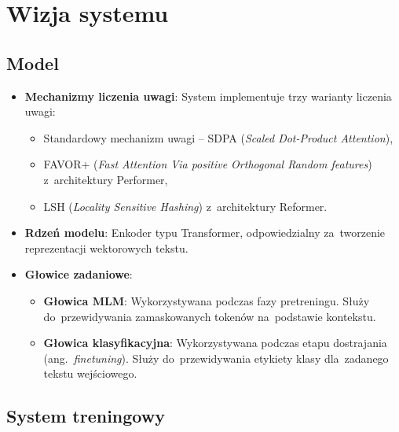 \documentclass[a4paper,11pt,twoside]{report}
\theoremstyle{definition}
\begin{document}
\section{Wizja systemu}


\subsection{Model}

\begin{itemize}
    \item \textbf{Mechanizmy liczenia uwagi}: System implementuje trzy warianty liczenia uwagi:
    \begin{itemize}
        \item Standardowy mechanizm uwagi -- SDPA (\emph{Scaled Dot-Product Attention}),
        \item FAVOR+ (\emph{Fast Attention Via positive Orthogonal Random features}) z~architektury Performer,
        \item LSH (\emph{Locality Sensitive Hashing}) z~architektury Reformer.
    \end{itemize}

    \item \textbf{Rdzeń modelu}: Enkoder typu Transformer, odpowiedzialny za~tworzenie reprezentacji wektorowych tekstu.
    \item \textbf{Głowice zadaniowe}:
    \begin{itemize}
        \item \textbf{Głowica MLM}: Wykorzystywana podczas fazy pretreningu. Służy do~przewidywania zamaskowanych tokenów na~podstawie kontekstu.
        \item \textbf{Głowica klasyfikacyjna}: Wykorzystywana podczas etapu dostrajania (ang.\ \emph{finetuning}). Służy do~przewidywania etykiety klasy dla~zadanego tekstu wejściowego.
    \end{itemize}
\end{itemize}

\subsection{System treningowy}
\end{document}
